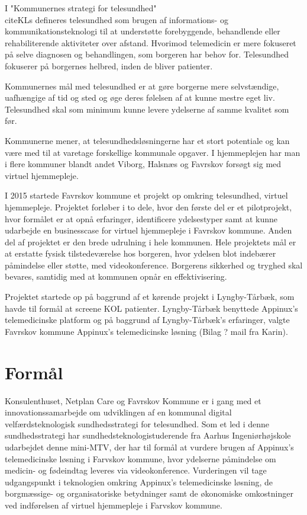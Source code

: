 I "Kommunernes strategi for telesundhed"\\cite{KLs} defineres telesundhed som brugen af informations- og kommunikationsteknologi til at understøtte forebyggende, behandlende eller rehabiliterende aktiviteter over afstand. Hvorimod telemedicin er mere fokuseret på selve diagnosen og behandlingen, som borgeren har behov for. Telesundhed fokuserer på borgernes helbred, inden de bliver patienter\cite{KLs}\cite{sundhed}.

Kommunernes mål med telesundhed er at gøre borgerne mere selvstændige, uafhængige af tid og sted og øge deres følelsen af at kunne mestre eget liv. Telesundhed skal som minimum kunne levere ydelserne af samme kvalitet som før\cite{KLs}.

Kommunerne mener, at telesundhedsløsningerne har et stort potentiale og kan være med til at varetage forskellige kommunale opgaver. I hjemmeplejen har man i flere kommuner blandt andet Viborg\cite{viborg}, Halsnæs\cite{hals} og Favrskov forsøgt sig med virtuel hjemmepleje. 

I 2015 startede Favrskov kommune et projekt op omkring telesundhed, virtuel hjemmepleje. Projektet forløber i to dele, hvor den første del er et pilotprojekt, hvor formålet er at opnå erfaringer, identificere ydelsestyper samt at kunne udarbejde en businesscase for virtuel hjemmepleje i Favrskov kommune. Anden del af projektet er den brede udrulning i hele kommunen. Hele projektets mål er at erstatte fysisk tilstedeværelse hos borgeren, hvor ydelsen blot indebærer påmindelse eller støtte, med videokonference. Borgerens sikkerhed og tryghed skal bevares, samtidig med at kommunen opnår en effektivisering\cite{projektplan}. 

Projektet startede op på baggrund af et kørende projekt i Lyngby-Tårbæk, som havde til formål at screene KOL patienter. Lyngby-Tårbæk benyttede Appinux's telemedicinske platform og på baggrund af Lyngby-Tårbæk's erfaringer, valgte Favrskov kommune Appinux's telemedicinske løsning (Bilag ? mail fra Karin).  

\section{Formål}
Konsulenthuset, Netplan Care og Favrskov Kommune er i gang med et innovationssamarbejde om udviklingen af en kommunal digital velfærdsteknologisk sundhedsstrategi for telesundhed. Som et led i denne sundhedsstrategi har sundhedsteknologistuderende fra Aarhus Ingeniørhøjskole udarbejdet denne mini-MTV, der har til formål at vurdere brugen af Appinux's telemedicinske løsning i Farvskov kommune, hvor ydelserne påmindelse om medicin- og fødeindtag leveres via videokonference. Vurderingen vil tage udgangspunkt i teknologien omkring Appinux's telemedicinske løsning, de borgmæssige- og organisatoriske betydninger samt de økonomiske omkostninger ved indførelsen af virtuel hjemmepleje i Farvskov kommune.  

